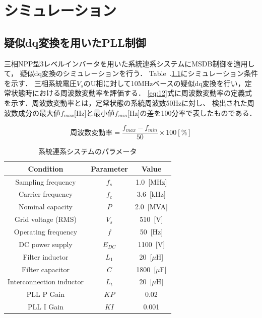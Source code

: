 
\chapter{シミュレーション}
\label{chap:シミュレーション}

\section{疑似dq変換を用いたPLL制御}
三相NPP型3レベルインバータを用いた系統連系システムにMSDB制御を適用して，
疑似dq変換のシミュレーションを行う．
Table~.\ref{tab:grid}にシミュレーション条件を示す．
三相系統電圧$V_s$のU相に対して10MHzベースの疑似dq変換を行い，定常状態時における周波数変動率を評価する．
\eqref{eq:12}式に周波数変動率の定義式を示す．周波数変動率とは，定常状態の系統周波数50Hzに対し、
検出された周波数成分の最大値$f_{max}$[Hz]と最小値$f_{min}$[Hz]の差を100分率で表したものである\cite{ref09}．

\begin{equation}
周波数変動率 = \frac{f_{max}-f_{min}}{50}×100 [\%]\label{eq:12} 
\end{equation}


\begin{table}[ht]
    \centering
    \caption{系統連系システムのパラメータ}
     \label{tab:grid}
    \begin{tabular}{c|c|c}
 \hline \hline
    Condition & Parameter & Value \\ \hline
    Sampling frequency        & $f_s$   & 1.0~[MHz] \\\hline
    Carrier frequency         & $f_c$   & 3.6~[kHz] \\\hline
    Nominal capacity          & $P$     & 2.0~[MVA] \\\hline
    Grid voltage (RMS)        & $V_s$   & 510~[V] \\\hline
    Operating frequency       & $f$     & 50~[Hz] \\\hline
    DC power supply           & $E_{DC}$& 1100~[V] \\\hline
    Filter inductor           & $L_1$   & 20~[$\mu$H] \\\hline
    Filter capacitor          & $C$     & 1800~[$\mu$F] \\\hline
    Interconnection inductor  & $L_t$   & 20~[$\mu$H] \\\hline
    PLL P Gain                & $KP$    & 0.02  \\\hline
    PLL I Gain                & $KI$    & 0.001 \\\hline
    \end{tabular}
\end{table}

